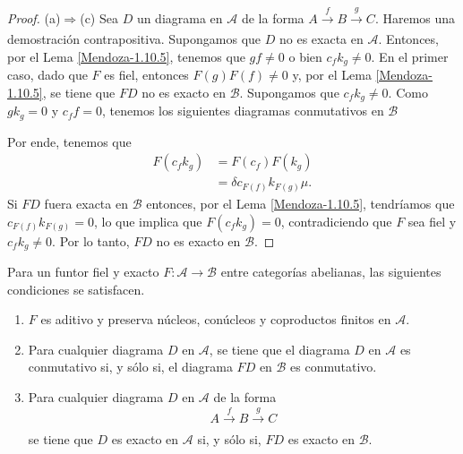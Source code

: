 \documentclass[tesis]{subfiles}
\begin{document}
\begin{proof}
    (a)$\Rightarrow$(c) Sea $D$ un diagrama en $\mathscr{A}$ de la forma $A\xrightarrow[]{f} B\xrightarrow[]{g} C$. Haremos una demostración contrapositiva. Supongamos que $D$ no es exacta en $\mathscr{A}$. Entonces, por el Lema \ref{Mendoza-1.10.5}, tenemos que $gf\neq0$ o bien $c_fk_g\neq0$. En el primer caso, dado que $F$ es fiel, entonces $F(g)F(f)\neq0$ y, por el Lema \ref{Mendoza-1.10.5}, se tiene que $FD$ no es exacto en $\mathscr{B}$. Supongamos que $c_fk_g\neq0$. Como $gk_g=0$ y $c_ff=0$, tenemos los siguientes diagramas conmutativos en $\mathscr{B}$
    \begin{center}
        \quad
    \end{center}
    Por ende, tenemos que
    \begin{align*}
        F(c_fk_g) &= F(c_f)F(k_g) \\
                  &= \delta c_{F(f)} k_{F(g)}\mu.
    \end{align*}
    Si $FD$ fuera exacta en $\mathscr{B}$ entonces, por el Lema \ref{Mendoza-1.10.5}, tendríamos que $c_{F(f)}k_{F(g)}=0$, lo que implica que $F(c_fk_g)=0$, contradiciendo que $F$ sea fiel y $c_fk_g\neq0$. Por lo tanto, $FD$ no es exacto en $\mathscr{B}$.
\end{proof}

\begin{Coro}\label{Mendoza-1.10.7}
    Para un funtor fiel y exacto $F:\mathscr{A}\to \mathscr{B}$ entre categorías abelianas, las siguientes condiciones se satisfacen.

    \begin{enumerate}[label=(\alph*)]
    
        \item $F$ es aditivo y preserva núcleos, conúcleos y coproductos finitos en $\mathscr{A}$.

        \item Para cualquier diagrama $D$ en $\mathscr{A}$, se tiene que el diagrama $D$ en $\mathscr{A}$ es conmutativo si, y sólo si, el diagrama $FD$ en $\mathscr{B}$ es conmutativo.

        \item Para cualquier diagrama $D$ en $\mathscr{A}$ de la forma
            \[
            A \xrightarrow[]{f} B\xrightarrow[]{g} C
            \] 
            se tiene que $D$ es exacto en $\mathscr{A}$ si, y sólo si, $FD$ es exacto en $\mathscr{B}$.
    \end{enumerate}
\end{Coro}
\end{document}
